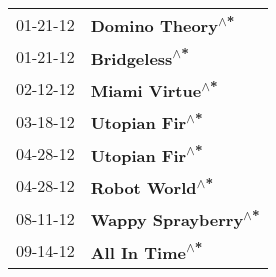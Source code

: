 \begin{supertabular}{p{0.25\columnwidth}p{0.75\columnwidth}}
 01-21-12 &     \textbf{Domino Theory\textsuperscript{$\wedge$*}} \\
 01-21-12 &        \textbf{Bridgeless\textsuperscript{$\wedge$*}} \\
 02-12-12 &      \textbf{Miami Virtue\textsuperscript{$\wedge$*}} \\
 03-18-12 &       \textbf{Utopian Fir\textsuperscript{$\wedge$*}} \\
 04-28-12 &       \textbf{Utopian Fir\textsuperscript{$\wedge$*}} \\
 04-28-12 &       \textbf{Robot World\textsuperscript{$\wedge$*}} \\
 08-11-12 &  \textbf{Wappy Sprayberry\textsuperscript{$\wedge$*}} \\
 09-14-12 &       \textbf{All In Time\textsuperscript{$\wedge$*}} \\
\end{supertabular}
